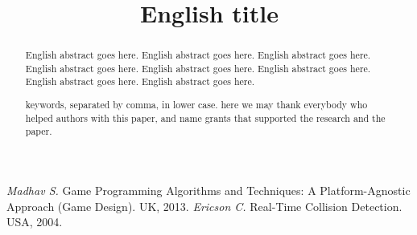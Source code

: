\documentclass[intlimits,twoside,a4paper,11pt]{article}
\begin{document}
    \begin{translatedpart}
        \title{English title}



        \maketranslatedtitle

        \begin{abstract}
            English abstract goes here. English abstract goes here. English abstract goes here. English abstract goes here.
            English abstract goes here. English abstract goes here. English abstract goes here. English abstract goes here.

            \keywords keywords, separated by comma, in lower case.
            \autocitationexample
            \acknowledgements here we may thank everybody who helped authors with this paper, and name grants that supported the research and the paper.
        \end{abstract}

        \begin{thebibliography}{9}
             {\it Madhav S.} Game Programming Algorithms and Techniques: A Platform-Agnostic Approach (Game Design). UK, 2013.
             {\it Ericson C.} Real-Time Collision Detection. USA, 2004.
        \end{thebibliography}

    \end{translatedpart}
\end{document}

